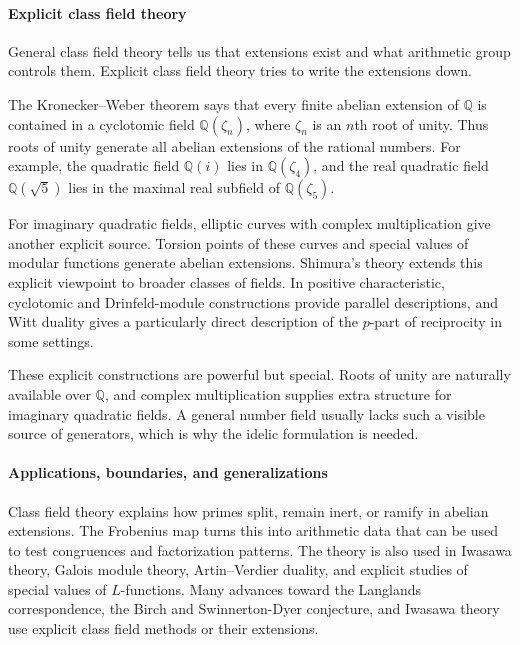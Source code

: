\paragraph{Explicit class field theory}

General class field theory tells us that extensions exist and what arithmetic group controls them. Explicit class field theory tries to write the extensions down.

The Kronecker--Weber theorem says that every finite abelian extension of $\mathbb Q$ is contained in a cyclotomic field $\mathbb Q(\zeta_n)$, where $\zeta_n$ is an $n$th root of unity. Thus roots of unity generate all abelian extensions of the rational numbers. For example, the quadratic field $\mathbb Q(i)$ lies in $\mathbb Q(\zeta_4)$, and the real quadratic field $\mathbb Q(\sqrt5)$ lies in the maximal real subfield of $\mathbb Q(\zeta_5)$. \cite{class_field_theory_ref1,class_field_theory_ref4}

For imaginary quadratic fields, elliptic curves with complex multiplication give another explicit source. Torsion points of these curves and special values of modular functions generate abelian extensions. Shimura's theory extends this explicit viewpoint to broader classes of fields. In positive characteristic, cyclotomic and Drinfeld-module constructions provide parallel descriptions, and Witt duality gives a particularly direct description of the $p$-part of reciprocity in some settings. \cite{class_field_theory_ref4}

These explicit constructions are powerful but special. Roots of unity are naturally available over $\mathbb Q$, and complex multiplication supplies extra structure for imaginary quadratic fields. A general number field usually lacks such a visible source of generators, which is why the idelic formulation is needed.

\paragraph{Applications, boundaries, and generalizations}

Class field theory explains how primes split, remain inert, or ramify in abelian extensions. The Frobenius map turns this into arithmetic data that can be used to test congruences and factorization patterns. The theory is also used in Iwasawa theory, Galois module theory, Artin--Verdier duality, and explicit studies of special values of $L$-functions. Many advances toward the Langlands correspondence, the Birch and Swinnerton-Dyer conjecture, and Iwasawa theory use explicit class field methods or their extensions. \cite{class_field_theory_ref1,class_field_theory_ref7}


